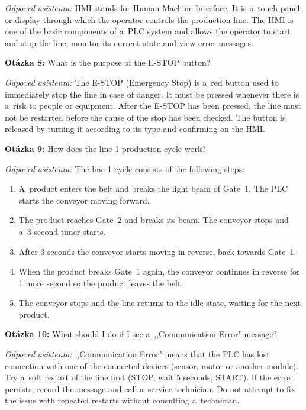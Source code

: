 \textit{Odpoveď asistenta:}
HMI stands for Human Machine Interface. It is a~touch panel or display
through which the operator controls the production line. The HMI is one of
the basic components of a~PLC system and allows the operator to start and
stop the line, monitor its current state and view error messages.

\bigskip
\noindent\textbf{Otázka 8:} What is the purpose of the E-STOP button?

\textit{Odpoveď asistenta:}
The E-STOP (Emergency Stop) is a~red button used to immediately stop the
line in case of danger. It must be pressed whenever there is a~risk to
people or equipment. After the E-STOP has been pressed, the line must not
be restarted before the cause of the stop has been checked. The button is
released by turning it according to its type and confirming on the HMI.

\bigskip
\noindent\textbf{Otázka 9:} How does the line 1 production cycle work?

\textit{Odpoveď asistenta:}
The line 1 cycle consists of the following steps:
\begin{enumerate}
      \item A~product enters the belt and breaks the light beam of Gate~1.
            The PLC starts the conveyor moving forward.
      \item The product reaches Gate~2 and breaks its beam. The conveyor
            stops and a~3-second timer starts.
      \item After 3 seconds the conveyor starts moving in reverse, back
            towards Gate~1.
      \item When the product breaks Gate~1 again, the conveyor continues in
            reverse for 1 more second so the product leaves the belt.
      \item The conveyor stops and the line returns to the idle state,
            waiting for the next product.
\end{enumerate}

\bigskip
\noindent\textbf{Otázka 10:} What should I do if I see a~,,Communication Error" message?

\textit{Odpoveď asistenta:}
,,Communication Error" means that the PLC has lost connection with one of
the connected devices (sensor, motor or another module). Try a~soft restart
of the line first (STOP, wait 5 seconds, START). If the error persists,
record the message and call a~service technician. Do not attempt to fix the
issue with repeated restarts without consulting a~technician.

